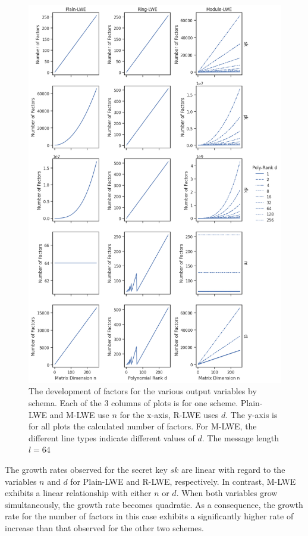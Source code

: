 \begin{figure}[ht!]
  \centering
  \includegraphics[scale=0.52]{images/OutputFactors.png}
  \caption[Output Variable Factors by Scheme]{The development of factors for the various output variables by schema. Each of the 3 columns of plots is for one scheme. Plain-LWE and M-LWE use $n$ for the x-axis, R-LWE uses $d$. The y-axis is for all plots the calculated number of factors. For M-LWE, the different line types indicate different values of $d$. The message length $l=64$}
  \label{fig:OutputFactors}
\end{figure}

The growth rates observed for the secret key $sk$ are linear with regard to the variables $n$ and $d$ for Plain-LWE and R-LWE, respectively. In contrast, M-LWE exhibits a linear relationship with either $n$ or $d$. When both variables grow simultaneously, the growth rate becomes quadratic. As a consequence, the growth rate for the number of factors in this case exhibits a significantly higher rate of increase than that observed for the other two schemes.

